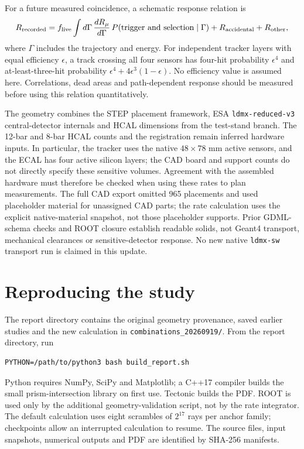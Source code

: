 For a future measured coincidence, a schematic response relation is
\begin{equation}
 R_{\rm recorded}=f_{\rm live}\int d\Gamma\,
 \frac{dR_\mu}{d\Gamma}\,P(\hbox{trigger and selection}\mid\Gamma)
 +R_{\rm accidental}+R_{\rm other},
\end{equation}
where $\Gamma$ includes the trajectory and energy. For independent tracker
layers with equal efficiency $\epsilon$, a track crossing all four sensors
has four-hit probability $\epsilon^4$ and at-least-three-hit probability
$\epsilon^4+4\epsilon^3(1-\epsilon)$. No efficiency value is assumed here.
Correlations, dead areas and path-dependent response should be measured
before using this relation quantitatively.

The geometry combines the STEP placement framework, ESA
\texttt{ldmx-reduced-v3} central-detector internals and HCAL dimensions from the
test-stand branch. The 12-bar and 8-bar HCAL counts and the registration remain
inferred hardware inputs. In particular, the tracker uses the native
$48\times78$ mm active sensors, and the ECAL has four active silicon layers;
the CAD board and support counts do not directly specify these sensitive
volumes. Agreement with the assembled hardware must therefore be checked
when using these rates to plan measurements.
The full CAD export omitted 965 placements and used
placeholder material for unassigned CAD parts; the rate calculation uses the
explicit native-material snapshot, not those placeholder supports. Prior
GDML-schema checks and ROOT closure establish readable solids, not Geant4
transport, mechanical clearances or sensitive-detector response. No new native
\texttt{ldmx-sw} transport run is claimed in this update.

\section{Reproducing the study}
The report directory contains the original geometry provenance, saved earlier
studies and the new calculation in \texttt{combinations\_20260919/}. From the
report directory, run
\begin{verbatim}
PYTHON=/path/to/python3 bash build_report.sh
\end{verbatim}
Python requires NumPy, SciPy and Matplotlib; a C++17 compiler builds the small
prism-intersection library on first use. Tectonic builds the PDF. ROOT is used
only by the additional geometry-validation script, not by the rate integrator.
The default calculation uses eight scrambles of $2^{17}$ rays per anchor family;
checkpoints allow an interrupted calculation to resume. The source files,
input snapshots, numerical outputs and PDF are identified by SHA-256 manifests.

